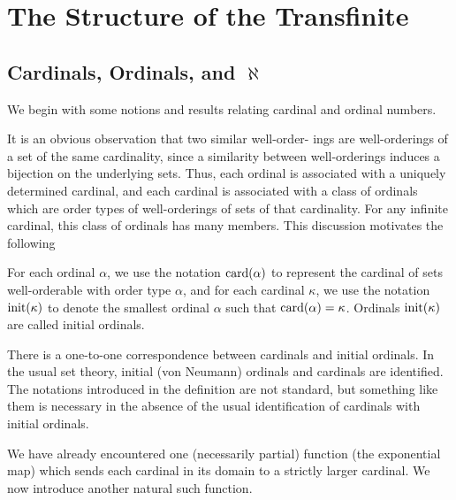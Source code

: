 \chapter{The Structure of the Transfinite}

\section[Cardinals, Ordinals, and $\aleph$]{Cardinals, Ordinals, and
$\aleph$}

We begin with some notions and results relating cardinal and ordinal
numbers.

It is an obvious observation that two similar
well-order-\linebreak
ings are 
well-orderings of a set of the same cardinality, since a similarity
between well-order\-ings induces a bijection on the underlying sets.
Thus, each ordinal is associated with a uniquely determined
cardinal, 
and each cardinal is associated with a class of ordinals
which are 
order types of well-orderings of sets of that cardinality.
For any 
infinite cardinal, this class of
ordinals has many members.  This 
discussion motivates the following

\begin{definition}
 For each ordinal $\alpha$, we use the notation
 $\mathop{\mathrm{card}}(\alpha)$ to represent the cardinal of sets
 well-orderable with 
 order type $\alpha$, and for each cardinal $\kappa$, we use
 the notation $\mathop{\mathrm{init}}(\kappa)$ to denote the smallest ordinal $\alpha$ such
 that $\mathop{\mathrm{card}}(\alpha) = \kappa$.  Ordinals
 $\mathop{\mathrm{init}}(\kappa)$ are called {\upshape initial ordinals\/}.
\end{definition}

There is a one-to-one correspondence between cardinals
and initial ordinals.  In the
usual set theory, initial (von
Neumann) ordinals and 
cardinals are identified.  The notations introduced in the definition
are not standard, but something like them is necessary in the absence
of the usual identification of cardinals with initial ordinals.

We have already encountered one (necessarily partial) function
(the exponential map) which sends each cardinal in its domain to
a strictly larger cardinal.  We now introduce another
natural such function.


